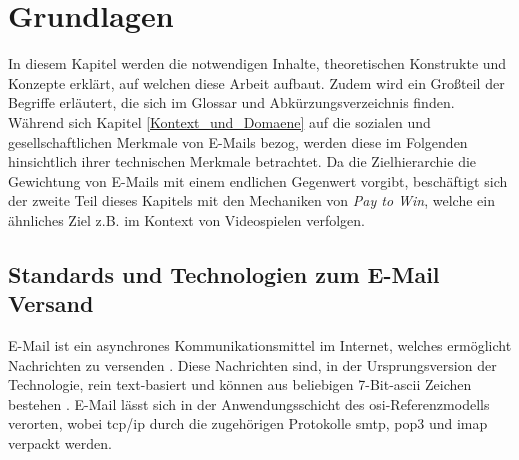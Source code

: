 
\chapter{Grundlagen}
\label{Grundlagen}

In diesem Kapitel werden die notwendigen Inhalte, theoretischen Konstrukte und Konzepte erklärt, auf welchen diese Arbeit aufbaut. Zudem wird ein Großteil der Begriffe erläutert, die sich im Glossar und Abkürzungsverzeichnis finden. Während sich Kapitel \ref{Kontext_und_Domaene} auf die sozialen und gesellschaftlichen Merkmale von E-Mails bezog, werden diese im Folgenden hinsichtlich ihrer technischen Merkmale betrachtet. Da die Zielhierarchie die Gewichtung von E-Mails mit einem endlichen Gegenwert vorgibt, beschäftigt sich der zweite Teil dieses Kapitels mit den Mechaniken von \textit{Pay to Win}, welche ein ähnliches Ziel z.B. im Kontext von Videospielen verfolgen.


\section{Standards und Technologien zum E-Mail Versand}

E-Mail ist ein asynchrones Kommunikationsmittel im Internet, welches ermöglicht Nachrichten zu versenden \citep[S. 142]{Kurose2014}. Diese Nachrichten sind, in der Ursprungsversion der Technologie, rein text-basiert und können aus beliebigen 7-Bit-\acrshort{ascii} Zeichen bestehen \citep[S. 9]{RFC5322}. E-Mail lässt sich in der Anwendungsschicht des \acrshort{osi}-Referenzmodells verorten, wobei \acrshort{tcp}/\acrshort{ip} durch die zugehörigen Protokolle \acrshort{smtp}, \acrshort{pop3} und \acrshort{imap} verpackt werden.

